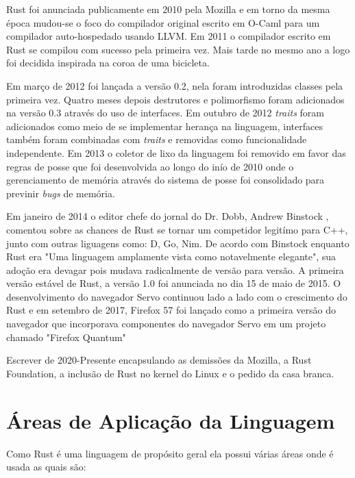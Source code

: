 Rust foi anunciada publicamente em 2010 pela Mozilla e em torno da mesma \'{e}poca mudou-se o foco do compilador original escrito em O-Caml para um compilador auto-hospedado usando LLVM. Em 2011 o compilador escrito em Rust se compilou com sucesso pela primeira vez. Mais tarde no mesmo ano a logo foi decidida inspirada na coroa de uma bicicleta.
\par
Em mar\c{c}o de 2012 foi lan\c{c}ada a vers\~{a}o 0.2, nela foram introduzidas classes pela primeira vez. Quatro meses depois destrutores e polimorfismo foram adicionados na vers\~{a}o 0.3 atrav\'{e}s do uso de interfaces. Em outubro de 2012 \textit{traits} foram adicionados como meio de se implementar heran\c{c}a na linguagem, interfaces tamb\'{e}m foram combinadas com \textit{traits} e removidas como funcionalidade independente. Em 2013 o coletor de lixo da linguagem foi removido em favor das regras de posse que foi desenvolvida ao longo do in\'{i}o de 2010 onde o gerenciamento de mem\'{o}ria atrav\'{e}s do sistema de posse foi consolidado para previnir \textit{bugs} de mem\'{o}ria.
\par
Em janeiro de 2014 o editor chefe do jornal do Dr. Dobb, Andrew Binstock \cite{Bin14}, comentou sobre as chances de Rust se tornar um competidor legit\'{i}mo para C++, junto com outras liguagens como: D, Go, Nim. De acordo com Binstock enquanto Rust era "Uma linguagem amplamente vista como notavelmente elegante", sua ado\c{c}\~{a}o era devagar pois mudava radicalmente de vers\~{a}o para vers\~{a}o. A primeira vers\~{a}o est\'{a}vel de Rust, a vers\~{a}o 1.0 foi anunciada no dia 15 de maio de 2015. O desenvolvimento do navegador Servo continuou lado a lado com o crescimento do Rust e em setembro de 2017, Firefox 57 foi lan\c{c}ado como a primeira vers\~{a}o do navegador que incorporava componentes do navegador Servo em um projeto chamado "Firefox Quantum"
\par
Escrever de 2020-Presente encapsulando as demiss\~{o}es da Mozilla, a Rust Foundation, a inclus\~{a}o de Rust no kernel do Linux e o pedido da casa branca.

\section{\'{A}reas de Aplica\c{c}\~{a}o da Linguagem}
Como Rust \'{e} uma linguagem de prop\'{o}sito geral ela possui v\'{a}rias \'{a}reas onde \'{e} usada as quais s\~{a}o:

